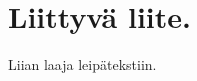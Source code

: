 \documentclass[12pt,a4paper,titlepage]{article}
\newcommand{\matr}[1]{\bm{#1}}
\newcommand{\transpose}[1]{{#1}^T}
\begin{document}


\newpage

 
\appendix
\newpage
\section{Liittyvä liite.} \label{koodi}
Liian laaja leipätekstiin.
\end{document}
